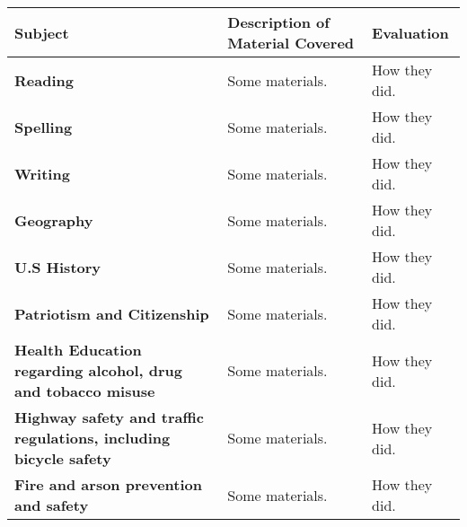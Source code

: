 \documentclass[10pt]{article}
\begin{document}
\newpage 

\noindent\begin{tabularx}{\textwidth}{ |p{2in}|X|X| }

\hline


{\bf Subject} & {\bf Description of Material Covered} & { \bf
  Evaluation } \\

\hline

{\bf Reading} &

Some materials. &

How they did. \\

\hline

{\bf Spelling} &

Some materials. &

How they did. \\

\hline

{\bf Writing} &

Some materials. &

How they did. \\

\hline

{\bf Geography} &

Some materials. &

How they did. \\

\hline

{\bf U.S History} &

Some materials. &

How they did. \\

\hline

{\bf Patriotism and Citizenship} &

Some materials. &

How they did. \\

\hline

{\bf Health Education regarding alcohol, drug and tobacco misuse} &

Some materials. &

How they did. \\

\hline

{\bf Highway safety and traffic regulations, including bicycle safety} &

Some materials. &

How they did. \\

\hline

{\bf Fire and arson prevention and safety} &

Some materials. &

How they did. \\

\hline

\end{tabularx}
\end{document}
